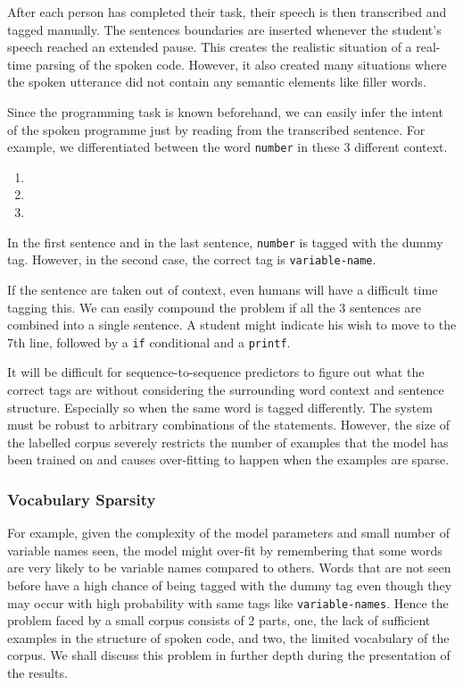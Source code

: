 \documentclass[fyp]{socreport}
\begin{document}
After each person has completed their task, their speech is then transcribed
and tagged manually. The sentences boundaries are inserted whenever the student's
speech reached an extended pause. This creates the realistic situation of
a real-time parsing of the spoken code. However, it also created many situations
where the spoken utterance did not contain any semantic elements like filler
words.

Since the programming task is known beforehand, we can easily infer the intent
of the spoken programme just by reading from the transcribed sentence. For example,
we differentiated between the word \texttt{number} in these 3 different context.

\begin{enumerate}
\itemsep0em
  \item {}    
  \item {}   
      
  \item {}    
\end{enumerate}

In the first sentence and in the last sentence, \texttt{number} is tagged
with the dummy tag. However, in the second case, the correct tag is
\texttt{variable-name}.

If the sentence are taken out of context, even humans will have a difficult
time tagging this.  We can easily compound the problem if all the 3 sentences
are combined into a single sentence. A student might indicate his wish to move
to the 7th line, followed by a \texttt{if} conditional and a \texttt{printf}.

It will be difficult for sequence-to-sequence predictors to figure out what the
correct tags are without considering the surrounding word context and sentence
structure. Especially so when the same word is tagged differently. The system
must be robust to arbitrary combinations of the statements. However, the size
of the labelled corpus severely restricts the number of examples that the model
has been trained on and causes over-fitting to happen when the examples are
sparse.

\subsubsection{Vocabulary Sparsity} For example, given the complexity of the
model parameters and small number of variable names seen, the model might
over-fit by remembering that some words are very likely to be variable names
compared to others. Words that are not seen before have a high chance of being
tagged with the dummy tag even though they may occur with high probability with
same tags like \texttt{variable-names}. Hence the problem faced by a small
corpus consists of 2 parts, one, the lack of sufficient examples in the
structure of spoken code, and two, the limited vocabulary of the corpus.  We
shall discuss this problem in further depth during the presentation of the
results.
\end{document}
